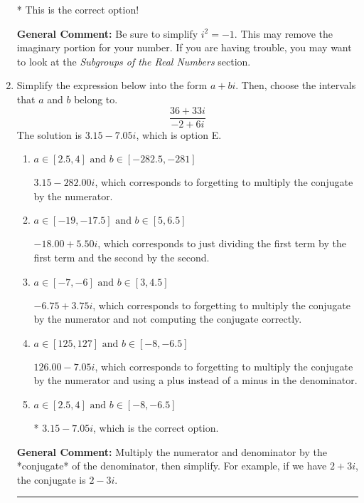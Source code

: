 \documentclass{extbook}[14pt]
\newcommand{\litem}[1]{\item #1

\rule{\textwidth}{0.4pt}}
\begin{document}
\begin{enumerate}
{\begin{enumerate}[label=\Alph*.]
* This is the correct option!
\end{enumerate}

\textbf{General Comment:} Be sure to simplify $i^2 = -1$. This may remove the imaginary portion for your number. If you are having trouble, you may want to look at the \textit{Subgroups of the Real Numbers} section.
}
\litem{
Simplify the expression below into the form $a+bi$. Then, choose the intervals that $a$ and $b$ belong to.
\[ \frac{36 + 33 i}{-2 + 6 i} \]The solution is \( 3.15  - 7.05 i \), which is option E.\begin{enumerate}[label=\Alph*.]
\item \( a \in [2.5, 4] \text{ and } b \in [-282.5, -281] \)

 $3.15  - 282.00 i$, which corresponds to forgetting to multiply the conjugate by the numerator.
\item \( a \in [-19, -17.5] \text{ and } b \in [5, 6.5] \)

 $-18.00  + 5.50 i$, which corresponds to just dividing the first term by the first term and the second by the second.
\item \( a \in [-7, -6] \text{ and } b \in [3, 4.5] \)

 $-6.75  + 3.75 i$, which corresponds to forgetting to multiply the conjugate by the numerator and not computing the conjugate correctly.
\item \( a \in [125, 127] \text{ and } b \in [-8, -6.5] \)

 $126.00  - 7.05 i$, which corresponds to forgetting to multiply the conjugate by the numerator and using a plus instead of a minus in the denominator.
\item \( a \in [2.5, 4] \text{ and } b \in [-8, -6.5] \)

* $3.15  - 7.05 i$, which is the correct option.
\end{enumerate}

\textbf{General Comment:} Multiply the numerator and denominator by the *conjugate* of the denominator, then simplify. For example, if we have $2+3i$, the conjugate is $2-3i$.
}
\end{enumerate}
\end{document}
